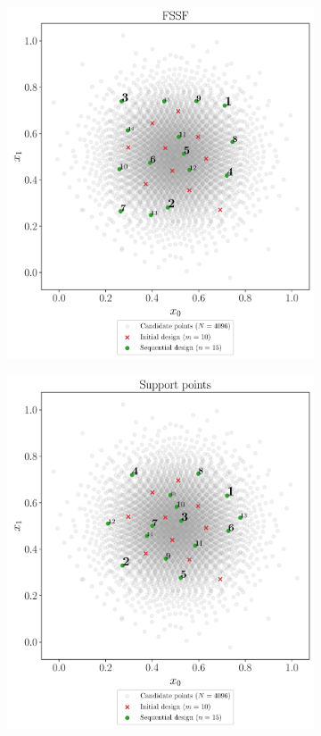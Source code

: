\begin{figure}
    \centering
    \begin{subfigure}[b]{0.48\linewidth}
        \centering
        \includegraphics[width=\textwidth]{./part2/figures/SIS/normal2D_FSSF.pdf}
    \end{subfigure}
    \begin{subfigure}[b]{0.48\linewidth}
        \centering
        \includegraphics[width=\textwidth]{./part2/figures/SIS/normal2D_SP.pdf}

\end{subfigure}
\end{figure}
